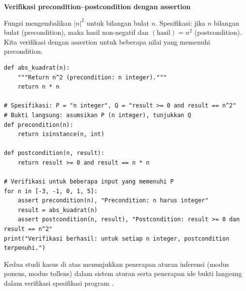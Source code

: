 \begin{contoh}
\textbf{Verifikasi precondition--postcondition dengan assertion}

Fungsi  mengembalikan $|n|^2$ untuk bilangan bulat $n$. Spesifikasi: jika $n$ bilangan bulat (precondition), maka hasil non-negatif dan $(\text{hasil}) = n^2$ (postcondition). Kita verifikasi dengan assertion untuk beberapa nilai yang memenuhi precondition.

\begin{lstlisting}[style=pythonstyle, caption={Verifikasi spesifikasi: jika precondition maka postcondition}]
def abs_kuadrat(n):
    """Return n^2 (precondition: n integer)."""
    return n * n

# Spesifikasi: P = "n integer", Q = "result >= 0 and result == n^2"
# Bukti langsung: asumsikan P (n integer), tunjukkan Q
def precondition(n):
    return isinstance(n, int)

def postcondition(n, result):
    return result >= 0 and result == n * n

# Verifikasi untuk beberapa input yang memenuhi P
for n in [-3, -1, 0, 1, 5]:
    assert precondition(n), "Precondition: n harus integer"
    result = abs_kuadrat(n)
    assert postcondition(n, result), "Postcondition: result >= 0 dan result == n^2"
print("Verifikasi berhasil: untuk setiap n integer, postcondition terpenuhi.")
\end{lstlisting}
\end{contoh}

Kedua studi kasus di atas menunjukkan penerapan aturan inferensi (modus ponens, modus tollens) dalam sistem aturan serta penerapan ide bukti langsung dalam verifikasi spesifikasi program \cite{rosen2019,stanford_cs103,mit_6042}.
